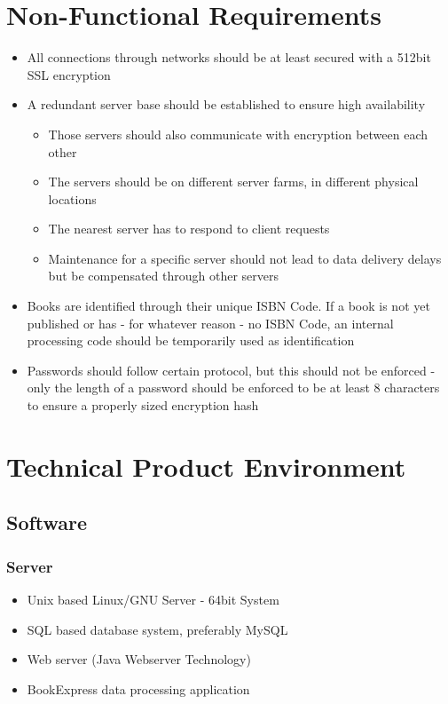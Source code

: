 \documentclass[11pt,a4paper,oneside,svgnames]{report}
\begin{document}
\chapter{Non-Functional Requirements}
\begin{itemize}
	\item All connections through networks should be at least secured with a 512bit SSL encryption
	\item A redundant server base should be established to ensure high availability
		\begin{itemize}
			\item Those servers should also communicate with encryption between each other
			\item The servers should be on different server farms, in different physical locations
			\item The nearest server has to respond to client requests
			\item Maintenance for a specific server should not lead to data delivery delays but be compensated through other servers
		\end{itemize}
	\item Books are identified through their unique ISBN Code. If a book is not yet published or has - for whatever reason - no ISBN Code, an internal processing code should be temporarily used as identification
	\item Passwords should follow certain protocol, but this should not be enforced - only the length of a password should be enforced to be at least 8 characters to ensure a properly sized encryption hash
\end{itemize}

\chapter{Technical Product Environment}
\section{Software}
	\subsection{Server}
		\begin{itemize}
			\item Unix based Linux/GNU Server - 64bit System
			\item SQL based database system, preferably MySQL
			\item Web server (Java Webserver Technology)
			\item BookExpress data processing application
		\end{itemize}
\end{document}
